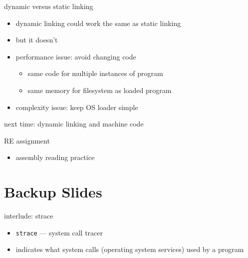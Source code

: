 \begin{frame}{dynamic versus static linking}
    \begin{itemize}
    \item dynamic linking could work the same as static linking
    \item but it doesn't
    \vspace{.5cm}
    \item performance issue: avoid changing code
        \begin{itemize}
        \item same code for multiple instances of program
        \item same memory for filesystem as loaded program
        \end{itemize}
    \item complexity issue: keep OS loader simple
    \end{itemize}
\end{frame}

\begin{frame}{next time: dynamic linking and machine code}
\end{frame}


\begin{frame}{RE assignment}
    \begin{itemize}
    \item assembly reading practice
    \end{itemize}
\end{frame}

\section*{Backup Slides}

\begin{frame}{interlude: strace}
\begin{itemize}
\item {\tt strace} --- system call tracer
\item indicates what system calls (operating system services) used by a program
\end{itemize}
\end{frame}

